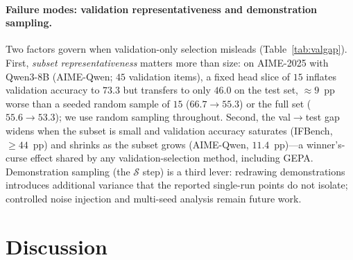 \documentclass[runningheads]{llncs}
\begin{document}
\paragraph{Failure modes: validation representativeness and demonstration sampling.}
Two factors govern when validation-only selection misleads (Table~\ref{tab:valgap}). First, \emph{subset representativeness} matters more than size: on AIME-2025 with Qwen3-8B (AIME-Qwen; $45$ validation items), a fixed head slice of $15$ inflates validation accuracy to $73.3$ but transfers to only $46.0$ on the test set, $\approx9$~pp worse than a seeded random sample of $15$ ($66.7\!\to\!55.3$) or the full set ($55.6\!\to\!53.3$); we use random sampling throughout. Second, the val$\to$test gap widens when the subset is small and validation accuracy saturates (IFBench, $\ge44$~pp) and shrinks as the subset grows (AIME-Qwen, $11.4$~pp)---a winner's-curse effect shared by any validation-selection method, including GEPA. Demonstration sampling (the $\mathcal{S}$ step) is a third lever: redrawing demonstrations introduces additional variance that the reported single-run points do not isolate; controlled noise injection and multi-seed analysis remain future work.

\begin{table}[htbp]
\centering
\caption{Validation$\to$test gap under validation-only selection. The gap is largest where the validation subset is small and validation accuracy saturates, and shrinks as the subset grows.}
\label{tab:valgap}
\end{table}

\section{Discussion}
\end{document}
